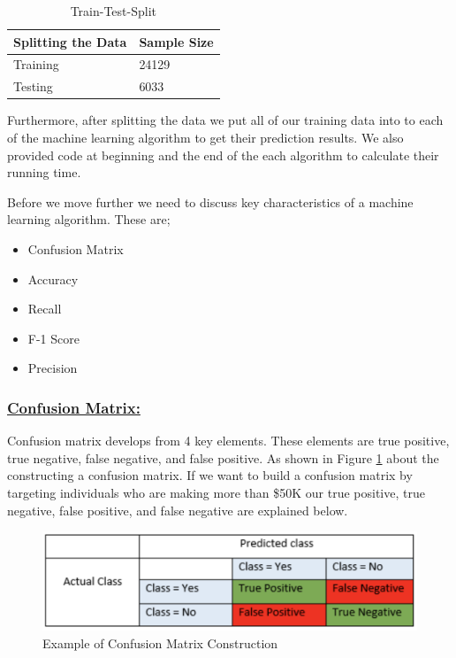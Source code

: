 \documentclass[sigconf]{acmart}
\begin{document}
\begin{table}[!ht]
\centering
\begin{tabular}{|l|l|}
\hline
\textbf{Splitting the Data} & \textbf{Sample Size} \\ \hline
Training                    & 24129                \\ \hline
Testing                     & 6033                 \\ \hline
\end{tabular}
\caption{Train-Test-Split}
\label{split}
\end{table}

\par Furthermore, after splitting the data we put all of our training data into to each of the machine learning algorithm to get their prediction results. We also provided code at beginning and the end of the each algorithm to calculate their running time.

\par Before we move further we need to discuss key characteristics of a machine learning algorithm. These are;

\begin{itemize}
    \item Confusion Matrix
    \item Accuracy
    \item Recall
    \item F-1 Score
    \item Precision 
\end{itemize}

\subsubsection{\textbf{\underline{Confusion Matrix:}}}
Confusion matrix develops from 4 key elements. These elements are true positive, true negative, false negative, and false positive. As shown in Figure \ref{fig:confusion-matrix} about the constructing a confusion matrix. If we want to build a confusion matrix by targeting individuals who are making more than \$50K our true positive, true negative, false positive, and false negative are explained below. 

\begin{figure}[!ht]
  \centering
      \includegraphics[width=\columnwidth]{project/images/confusion-matrix.png}
  \caption{Example of Confusion Matrix Construction \cite{www-exsilio}}\label{fig:confusion-matrix}
\end{figure}
\end{document}
